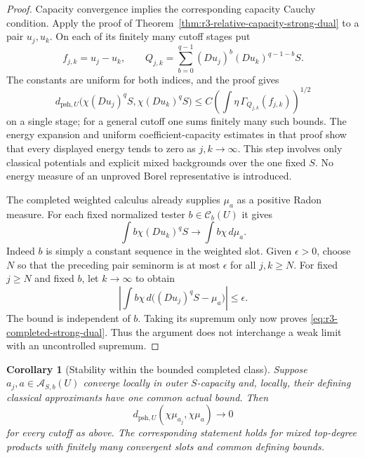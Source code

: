 \documentclass[11pt,a4paper]{article}
\numberwithin{equation}{section}
\newtheorem{corollary}[theorem]{Corollary}
\theoremstyle{definition}
\theoremstyle{remark}
\begin{document}
\begin{proof}
Capacity convergence implies the corresponding capacity Cauchy
condition. Apply the proof of
Theorem~\ref{thm:r3-relative-capacity-strong-dual} to a pair
$u_j,u_k$. On each of its finitely many cutoff stages put
\[
 f_{j,k}=u_j-u_k,\qquad
 Q_{j,k}=\sum_{b=0}^{q-1}(Du_j)^b(Du_k)^{q-1-b}S.
\]
The constants are uniform for both indices, and the proof gives
\[
 d_{\mathrm{psh},U}\bigl(\chi(Du_j)^qS,\chi(Du_k)^qS\bigr)
       \leq C\left(\int\eta\,\Gamma_{Q_{j,k}}(f_{j,k})
                                                   \right)^{1/2}
\]
on a single stage; for a general cutoff one sums finitely many
such bounds. The energy expansion and uniform coefficient-capacity
estimates in that proof show that every displayed energy tends
to zero as $j,k\to\infty$. This step involves only classical
potentials and explicit mixed backgrounds over the one fixed $S$.
No energy measure of an unproved Borel representative is introduced.

The completed weighted calculus already supplies
$\mathcal\mu_a$ as a positive Radon measure. For each fixed
normalized tester $b\in\mathcal C_b(U)$ it gives
\[
 \int b\chi(Du_k)^qS\longrightarrow\int b\chi\,d\mathcal\mu_a.
\]
Indeed $b$ is simply a constant sequence in the weighted slot.
Given $\epsilon>0$, choose $N$ so that the preceding pair
seminorm is at most $\epsilon$ for all $j,k\geq N$. For
fixed $j\geq N$ and fixed $b$, let $k\to\infty$ to obtain
\[
 \left|\int b\chi\,d\bigl((Du_j)^qS-\mathcal\mu_a\bigr)\right|
                         \leq\epsilon.
\]
The bound is independent of $b$. Taking its supremum only now
proves \eqref{eq:r3-completed-strong-dual}. Thus the argument
does not interchange a weak limit with an uncontrolled supremum.
\end{proof}

\begin{corollary}[Stability within the bounded completed class]
\label{cor:r3-strong-within-completion}
Suppose $a_j,a\in\mathcal A_{S,b}(U)$ converge locally in outer
$S$-capacity and, locally, their defining classical approximants
have one common actual bound. Then
\[
 d_{\mathrm{psh},U}(\chi\mathcal\mu_{a_j},
                         \chi\mathcal\mu_a)\longrightarrow0
\]
for every cutoff as above. The corresponding statement holds for
mixed top-degree products with finitely many convergent slots and
common defining bounds.
\end{corollary}
\end{document}
